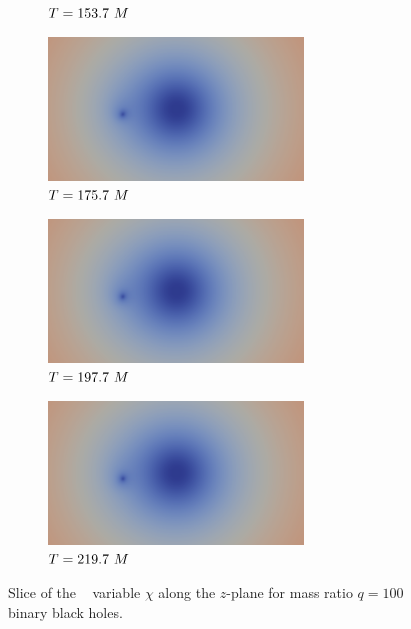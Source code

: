 \documentclass[landscape]{a0poster}
\begin{document}
\begin{textblock}{62}
\begin{textblock}{38}
\begin{figure}
\begin{subfigure}{0.0714\textwidth}
		\caption{\small ${T}=153.7~M$}
	\end{subfigure}
	\begin{subfigure}{0.0714\textwidth}
		\centering
		\includegraphics[height=1.5in]{figs/AE/r100/img_slice_000160.png}
		\caption{\small ${T}=175.7~M$}
	\end{subfigure}
	\begin{subfigure}{0.0714\textwidth}
		\centering
		\includegraphics[height=1.5in]{figs/AE/r100/img_slice_000180.png}
		\caption{\small ${T}=197.7~M$}
	\end{subfigure}
	\begin{subfigure}{0.0714\textwidth}
		\centering
		\includegraphics[height=1.5in]{figs/AE/r100/img_slice_000200.png}
		\caption{\small ${T}=219.7~M$}
	\end{subfigure}
	\caption{Slice of the \BSSN~ variable $\chi$ along the $z$-plane for mass ratio $q=100$ binary black holes.}
\end{figure}
\end{textblock}


\end{textblock}
\end{document}

